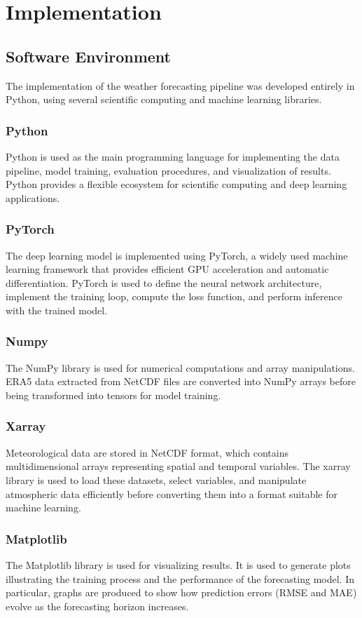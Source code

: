 \chapter{Implementation}
\label{chap:Implementation}

\section{Software Environment}
The implementation of the weather forecasting pipeline was developed entirely in Python, using several scientific computing and machine learning libraries.
\subsection{Python}
Python is used as the main programming language for implementing the data pipeline, model training, evaluation procedures, and visualization of results. Python provides a flexible ecosystem for scientific computing and deep learning applications.
\subsection{PyTorch}
The deep learning model is implemented using PyTorch, a widely used machine learning framework that provides efficient GPU acceleration and automatic differentiation. PyTorch is used to define the neural network architecture, implement the training loop, compute the loss function, and perform inference with the trained model.
\subsection{Numpy}
The NumPy library is used for numerical computations and array manipulations. ERA5 data extracted from NetCDF files are converted into NumPy arrays before being transformed into tensors for model training.
\subsection{Xarray}
Meteorological data are stored in NetCDF format, which contains multidimensional arrays representing spatial and temporal variables. The xarray library is used to load these datasets, select variables, and manipulate atmospheric data efficiently before converting them into a format suitable for machine learning.
\subsection{Matplotlib}
The Matplotlib library is used for visualizing results. It is used to generate plots illustrating the training process and the performance of the forecasting model. In particular, graphs are produced to show how prediction errors (RMSE and MAE) evolve as the forecasting horizon increases.
